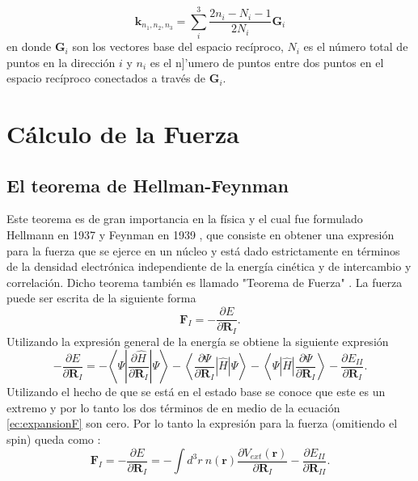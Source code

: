    \begin{equation}
   \pmb{k}_{n_1, n_2, n_3} = \sum_{i}^{3} \frac{2 n_i -N_i-1}{2N_i} \pmb{G}_i \label{ec:sampleMP}
   \end{equation}
   en donde $\pmb{G}_i $ son los vectores base del espacio rec\'iproco, $N_i$ es el n\'umero total de puntos en la direcci\'on $i$ y $n_i$ es el n]'umero de puntos  entre dos puntos en el espacio rec\'iproco conectados a trav\'es de  $\pmb{G}_i $.
    
   \section{C\'alculo de la Fuerza} \label{sec:Fuerza}
   \subsection{El teorema de Hellman-Feynman} \label{subsec:HellFey}
   Este teorema es de gran importancia en la f\'isica y el cual fue formulado Hellmann en 1937 \cite{Hellman-1937} y Feynman en 1939 \cite{PhysRev.56.340}, que consiste en obtener una expresi\'on  para la fuerza  que se ejerce en un n\'ucleo  y est\'a dado estrictamente en t\'erminos de la densidad electr\'onica independiente de la energ\'ia cin\'etica y de intercambio y correlaci\'on. Dicho  teorema tambi\'en es llamado  "Teorema de Fuerza" \cite{Martin-2004}. La fuerza puede ser escrita de la siguiente forma
   \begin{equation}
   \pmb{F}_I = - \frac{\partial E}{\partial \pmb{R}_I}. \label{ec:Fuerza}
   \end{equation} 
   Utilizando la expresi\'on general de la energ\'ia se obtiene la siguiente expresi\'on \cite{Martin-2004}
   \begin{equation}
   -\frac{\partial E}{\partial \pmb{R}_I} = - \left\langle \Psi \left| \frac{\partial \hat{H}}{\partial \pmb{R}_I} \right| \Psi \right\rangle- \left\langle \frac{\partial \Psi}{\partial \pmb{R}_I} \left| \hat{H} \right| \Psi \right\rangle - \left\langle \Psi \left| \hat{H} \right|  \frac{\partial \Psi}{\partial \pmb{R}_I} \right\rangle - \frac{\partial E_{II}}{\partial \pmb{R}_I}. \label{ec:expansionF}
   \end{equation}
   Utilizando el hecho de que se est\'a en el estado base se conoce que este es un extremo y por lo tanto los dos t\'erminos de en medio de la ecuaci\'on \ref{ec:expansionF} son cero. Por lo tanto la expresi\'on para la fuerza (omitiendo el spin) queda como \cite{MB-2015}:
   \begin{equation}
   \pmb{F}_I = -\frac{\partial E}{\partial \pmb{R}_I} = - \int d^3 r ~n(\pmb{r}) \frac{\partial V_{ext} (\pmb{r})}{\partial \pmb{R}_I}- \frac{\partial E_{II}}{\partial \pmb{R}_{II}}. \label{ec:FHFuerza} 
   \end{equation} 
